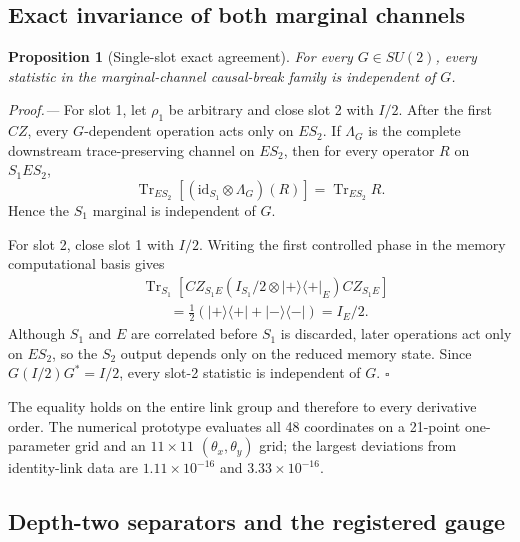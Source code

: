 \documentclass[aps,prl,onecolumn,superscriptaddress,nofootinbib]{revtex4-2}
\newcommand{\Tr}{\operatorname{Tr}}
\newcommand{\id}{\mathrm{id}}
\newtheorem{proposition}{Proposition}
\begin{document}
\subsection{Exact invariance of both marginal channels}

\begin{proposition}[Single-slot exact agreement]
\label{prop:single-slot-invariance}
For every $G\in SU(2)$, every statistic in the marginal-channel causal-break family is independent of $G$.
\end{proposition}

\emph{Proof.---}
For slot 1, let $\rho_1$ be arbitrary and close slot 2 with $I/2$.  After the first $CZ$, every $G$-dependent operation acts only on $ES_2$.  If $\Lambda_G$ is the complete downstream trace-preserving channel on $ES_2$, then for every operator $R$ on $S_1ES_2$,
\begin{equation}
 \Tr_{ES_2}\!\left[(\id_{S_1}\otimes\Lambda_G)(R)\right]
 =\Tr_{ES_2}R.
 \label{eq:no-signalling}
\end{equation}
Hence the $S_1$ marginal is independent of $G$.

For slot 2, close slot 1 with $I/2$.  Writing the first controlled phase in the memory computational basis gives
\begin{align}
 &\Tr_{S_1}\!\left[CZ_{S_1E}
 \left(I_{S_1}/2\otimes|+\rangle\!\langle+|_E\right)
 CZ_{S_1E}\right]\nonumber\\
 &\qquad=\frac12\left(|+\rangle\!\langle+|+|-\rangle\!\langle-|\right)=I_E/2.
 \label{eq:memory-pinning}
\end{align}
Although $S_1$ and $E$ are correlated before $S_1$ is discarded, later operations act only on $ES_2$, so the $S_2$ output depends only on the reduced memory state.  Since $G(I/2)G^*=I/2$, every slot-2 statistic is independent of $G$. \hfill$\square$

The equality holds on the entire link group and therefore to every derivative order.  The numerical prototype evaluates all 48 coordinates on a 21-point one-parameter grid and an $11\times11$ $(\theta_x,\theta_y)$ grid; the largest deviations from identity-link data are $1.11\times10^{-16}$ and $3.33\times10^{-16}$.

\subsection{Depth-two separators and the registered gauge}
\end{document}
